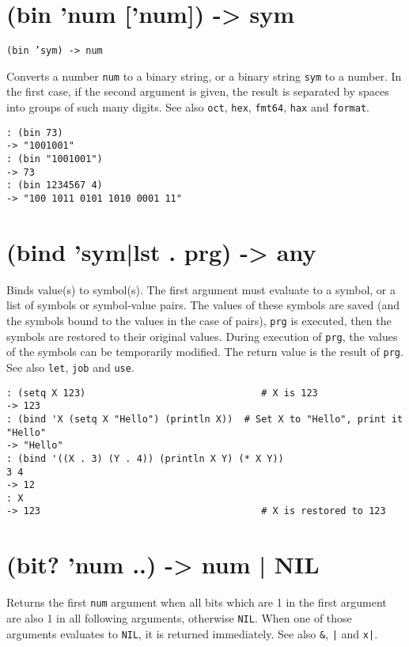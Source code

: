 { 
\section{(bin 'num ['num]) -> sym}
\label{sec-8-1-2-10}


\texttt{(bin 'sym) -> num}

Converts a number \texttt{num} to a binary string, or a binary string \texttt{sym} to
a number. In the first case, if the second argument is given, the result
is separated by spaces into groups of such many digits. See also \texttt{oct},
\texttt{hex}, \texttt{fmt64}, \texttt{hax} and \texttt{format}.


\begin{verbatim}
: (bin 73)
-> "1001001"
: (bin "1001001")
-> 73
: (bin 1234567 4)
-> "100 1011 0101 1010 0001 11"
\end{verbatim}

 
\section{(bind 'sym|lst . prg) -> any}
\label{sec-8-1-2-11}


Binds value(s) to symbol(s). The first argument must evaluate to a
symbol, or a list of symbols or symbol-value pairs. The values of these
symbols are saved (and the symbols bound to the values in the case of
pairs), \texttt{prg} is executed, then the symbols are restored to their
original values. During execution of \texttt{prg}, the values of the symbols
can be temporarily modified. The return value is the result of \texttt{prg}.
See also \texttt{let}, \texttt{job} and \texttt{use}.


\begin{verbatim}
: (setq X 123)                               # X is 123
-> 123
: (bind 'X (setq X "Hello") (println X))  # Set X to "Hello", print it
"Hello"
-> "Hello"
: (bind '((X . 3) (Y . 4)) (println X Y) (* X Y))
3 4
-> 12
: X
-> 123                                       # X is restored to 123
\end{verbatim}

 
\section{(bit? 'num ..) -> num | NIL}
\label{sec-8-1-2-12}


Returns the first \texttt{num} argument when all bits which are 1 in the first
argument are also 1 in all following arguments, otherwise \texttt{NIL}. When
one of those arguments evaluates to \texttt{NIL}, it is returned immediately.
See also \texttt{\&}, \texttt{|} and \texttt{x|}.


}
